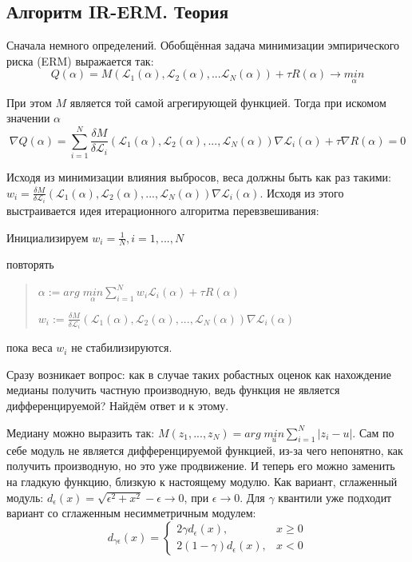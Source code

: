 \subsection{Алгоритм IR-ERM. Теория}

Сначала немного определений. Обобщённая задача минимизации эмпирического риска (ERM) выражается так:
$$Q(\alpha) = M(\mathscr{L}_1(\alpha), \mathscr{L}_2(\alpha), ... \mathscr{L}_N(\alpha)) + \tau R(\alpha) \xrightarrow{} \underset{\alpha}{min}$$

При этом $M$ является той самой агрегирующей функцией. Тогда при искомом значении $\alpha$
$$\nabla Q(\alpha) = \sum_{i=1}^N \frac{\delta M}{\delta \mathscr{L}_i}(\mathscr{L}_1(\alpha), \mathscr{L}_2(\alpha), ..., \mathscr{L}_N(\alpha)) \nabla \mathscr{L}_i(\alpha) + \tau \nabla R(\alpha) = 0$$

Исходя из минимизации влияния выбросов, веса должны быть как раз такими: $w_i = \frac{\delta M}{\delta \mathscr{L}_i}(\mathscr{L}_1(\alpha), \mathscr{L}_2(\alpha), ..., \mathscr{L}_N(\alpha)) \nabla \mathscr{L}_i(\alpha)$. Исходя из этого выстраивается идея итерационного алгоритма перевзвешивания:

Инициализируем $w_i = \frac{1}{N}, i = 1,...,N$

повторять
\begin{quote}
    $\alpha := arg \; \underset{\alpha}{min} \sum_{i=1}^N w_i \mathscr{L}_i(\alpha) + \tau R(\alpha)$\
    
    $w_i := \frac{\delta M}{\delta \mathscr{L}_i}(\mathscr{L}_1(\alpha), \mathscr{L}_2(\alpha), ..., \mathscr{L}_N(\alpha)) \nabla \mathscr{L}_i(\alpha)$
\end{quote}

пока веса $w_i$ не стабилизируются.

Сразу возникает вопрос: как в случае таких робастных оценок как нахождение медианы получить частную производную, ведь функция не является дифференцируемой? Найдём ответ и к этому.

Медиану можно выразить так: $M(z_1, ..., z_N) = arg \; \underset{u}{min} \sum_{i=1}^N |z_i - u|$. Сам по себе модуль не является дифференцируемой функцией, из-за чего непонятно, как получить производную, но это уже продвижение. И теперь его можно заменить на гладкую функцию, близкую к настоящему модулю. Как вариант, сглаженный модуль: $d_{\epsilon}(x) = \sqrt{\epsilon ^ 2 + x^ 2} - \epsilon \xrightarrow{} 0$, при $\epsilon \xrightarrow{} 0$.
Для $\gamma$ квантили уже подходит вариант со сглаженным несимметричным модулем:
\[
    d_{\gamma \epsilon}(x)= 
\begin{cases}
    2\gamma d_{\epsilon}(x),& x \geq 0\\
    2(1 - \gamma) d_{\epsilon}(x),& x < 0
\end{cases}
\]

